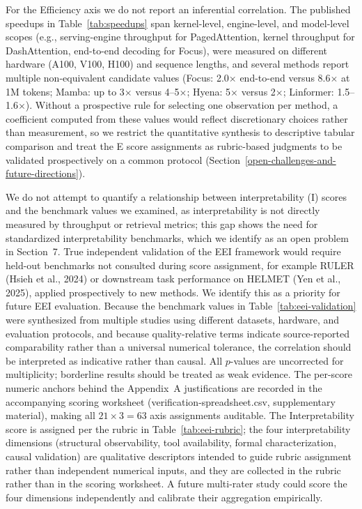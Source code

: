 \documentclass[10pt,twocolumn]{article}
\begin{document}
For the Efficiency axis we do not report an inferential correlation. The published speedups in Table~\ref{tab:speedups} span kernel-level, engine-level, and model-level scopes (e.g., serving-engine throughput for PagedAttention, kernel throughput for DashAttention, end-to-end decoding for Focus), were measured on different hardware (A100, V100, H100) and sequence lengths, and several methods report multiple non-equivalent candidate values (Focus: 2.0$\times$ end-to-end versus 8.6$\times$ at 1M tokens; Mamba: up to 3$\times$ versus 4--5$\times$; Hyena: 5$\times$ versus 2$\times$; Linformer: 1.5--1.6$\times$). Without a prospective rule for selecting one observation per method, a coefficient computed from these values would reflect discretionary choices rather than measurement, so we restrict the quantitative synthesis to descriptive tabular comparison and treat the E score assignments as rubric-based judgments to be validated prospectively on a common protocol (Section~\ref{open-challenges-and-future-directions}).

We do not attempt to quantify a relationship between interpretability (I) scores and the benchmark values we examined, as interpretability is not directly measured by throughput or retrieval metrics; this gap shows the need for standardized interpretability benchmarks, which we identify as an open problem in Section~7. True independent validation of the EEI framework would require held-out benchmarks not consulted during score assignment, for example RULER (Hsieh et al., 2024) or downstream task performance on HELMET (Yen et al., 2025), applied prospectively to new methods. We identify this as a priority for future EEI evaluation. Because the benchmark values in Table~\ref{tab:eei-validation} were synthesized from multiple studies using different datasets, hardware, and evaluation protocols, and because quality-relative terms indicate source-reported comparability rather than a universal numerical tolerance, the correlation should be interpreted as indicative rather than causal. All $p$-values are uncorrected for multiplicity; borderline results should be treated as weak evidence. The per-score numeric anchors behind the Appendix~A justifications are recorded in the accompanying scoring worksheet (verification-spreadsheet.csv, supplementary material), making all $21 \times 3 = 63$ axis assignments auditable. The Interpretability score is assigned per the rubric in Table~\ref{tab:eei-rubric}; the four interpretability dimensions (structural observability, tool availability, formal characterization, causal validation) are qualitative descriptors intended to guide rubric assignment rather than independent numerical inputs, and they are collected in the rubric rather than in the scoring worksheet. A future multi-rater study could score the four dimensions independently and calibrate their aggregation empirically.
\end{document}
